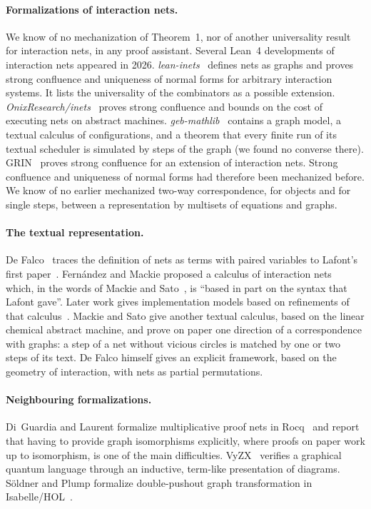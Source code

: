 \documentclass[11pt,a4paper]{article}
\begin{document}
\paragraph{Formalizations of interaction nets.}
We know of no mechanization of Theorem~1, nor of another universality result for interaction
nets, in any proof assistant. Several Lean~4 developments of interaction nets appeared in 2026.
\emph{lean-inets}~\cite{leaninets} defines nets as graphs and proves strong confluence and
uniqueness of normal forms for arbitrary interaction systems. It lists the universality of the
combinators as a possible extension. \emph{OnixResearch/inets}~\cite{onixinets} proves strong
confluence and bounds on the cost of executing nets on abstract machines.
\emph{geb-mathlib}~\cite{gebmathlib} contains a graph model, a textual calculus of
configurations, and a theorem that every finite run of its textual scheduler is simulated by
steps of the graph (we found no converse there). GRIN~\cite{grin} proves strong confluence for
an extension of interaction nets. Strong confluence and uniqueness of normal forms had
therefore been mechanized before. We know of no earlier mechanized two-way correspondence, for
objects and for single steps, between a representation by multisets of equations and graphs.

\paragraph{The textual representation.}
De Falco~\cite{defalco2010} traces the definition of nets as terms with paired variables to
Lafont's first paper~\cite{lafont1990}. Fern\'andez and Mackie proposed a calculus of
interaction nets~\cite{fernandezmackie1999} which, in the words of Mackie and
Sato~\cite{mackiesato2008}, is ``based in part on the syntax that Lafont gave''. Later work
gives implementation models based on refinements of that calculus~\cite{hassan2015}. Mackie
and Sato give another textual calculus, based on the linear chemical abstract machine, and prove on paper one
direction of a correspondence with graphs: a step of a net without vicious circles is matched
by one or two steps of its text. De Falco himself gives an explicit framework, based on the
geometry of interaction, with nets as partial permutations.

\paragraph{Neighbouring formalizations.}
Di~Guardia and Laurent formalize multiplicative proof nets in Rocq~\cite{diguardia2025} and
report that having to provide graph isomorphisms explicitly, where proofs on paper work up to
isomorphism, is one of the main difficulties. VyZX~\cite{vyzx}
verifies a graphical quantum language through an inductive, term-like presentation of
diagrams. S\"oldner and Plump formalize double-pushout graph transformation in
\mbox{Isabelle/HOL}~\cite{soldner2024}.
\end{document}
